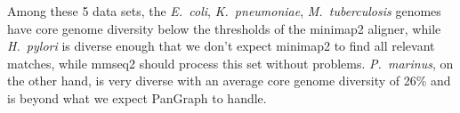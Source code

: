 \documentclass[aps,rmp,preprint,superscriptaddress,10pt,linenumbers]{revtex4-1}
\newcommand{\SIdataBenchmark}{V}
\begin{document}

Among these 5 data sets, the \textit{E.~coli}, \textit{K.~pneumoniae}, \textit{M.~tuberculosis} genomes have core genome diversity below the thresholds of the minimap2 aligner, while \textit{H.~pylori} is diverse enough that we don't expect minimap2 to find all relevant matches, while mmseq2 should process this set without problems.
\textit{P.~marinus}, on the other hand, is very diverse with an average core genome diversity of 26\% and is beyond what we expect PanGraph to handle.

\end{document}
